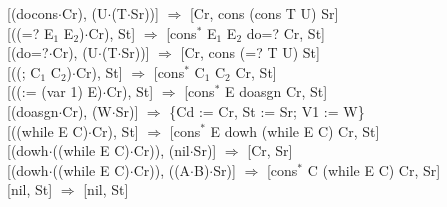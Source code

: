 \indent\hspace{0.5cm}[(docons$\cdot$Cr), (U$\cdot$(T$\cdot$Sr))]\hspace{0.7cm} $\Rightarrow$ \hspace{0.5cm} [Cr, cons (cons T U) Sr]\\
\indent\hspace{0.5cm}[((=? E$_1$ E$_2$)$\cdot$Cr), St]\hspace{1.35cm} $\Rightarrow$ \hspace{0.5cm} [cons$^{*}$ E$_1$ E$_2$ do=? Cr, St]\\
\indent\hspace{0.5cm}[(do=?$\cdot$Cr), (U$\cdot$(T$\cdot$Sr))]\hspace{1cm} $\Rightarrow$ \hspace{0.5cm} [Cr, cons (=? T U) St]\\
\indent\hspace{0.5cm}[((; C$_1$ C$_2$)$\cdot$Cr), St]\hspace{1.8cm} $\Rightarrow$ \hspace{0.5cm} [cons$^{*}$ C$_1$ C$_2$ Cr, St]\\
\indent\hspace{0.5cm}[((:= (var 1) E)$\cdot$Cr), St]\hspace{0.9cm} $\Rightarrow$ \hspace{0.5cm} [cons$^{*}$ E doasgn Cr, St]\\
\indent\hspace{0.5cm}[(doasgn$\cdot$Cr), (W$\cdot$Sr)]\hspace{1.35cm} $\Rightarrow$ \hspace{0.5cm} \{Cd := Cr, St := Sr; V1 := W\}\\
\indent\hspace{0.5cm}[((while E C)$\cdot$Cr), St]\hspace{1.35cm} $\Rightarrow$ \hspace{0.5cm} [cons$^{*}$ E dowh (while E C) Cr, St]\\
\indent\hspace{0.5cm}[(dowh$\cdot$((while E C)$\cdot$Cr)), (nil$\cdot$Sr)]\hspace{0.85cm} $\Rightarrow$ \hspace{0.5cm} [Cr, Sr]\\
\indent\hspace{0.5cm}[(dowh$\cdot$((while E C)$\cdot$Cr)), ((A$\cdot$B)$\cdot$Sr)]\hspace{0.3cm} $\Rightarrow$ \hspace{0.5cm} [cons$^{*}$ C (while E C) Cr, Sr]\\
\indent\hspace{0.5cm}[nil, St]\hspace{3.9cm} $\Rightarrow$ \hspace{0.5cm} [nil, St]\\

